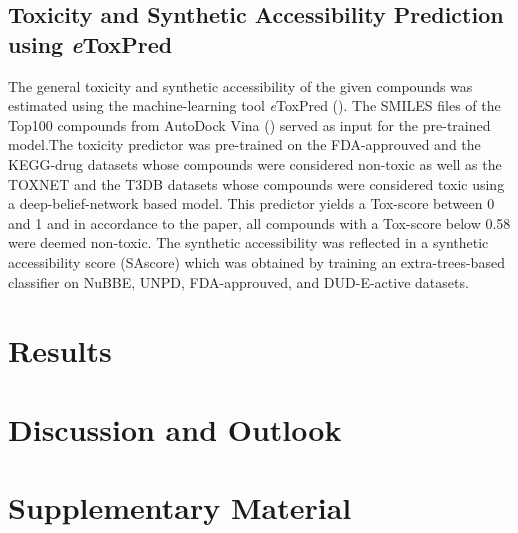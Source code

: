 \documentclass[11pt, letterpaper, titlepage]{article}
\begin{document}
\subsection{Toxicity and Synthetic Accessibility Prediction using \textit{e}ToxPred}
The general toxicity and synthetic accessibility of the given compounds was estimated using the machine-learning tool \textit{e}ToxPred (\cite{pu2019toxpred}). The SMILES files of the Top100 compounds from AutoDock Vina (\cite{Trott.2010}) served as input for the pre-trained model.The toxicity predictor was pre-trained on the FDA-approuved and the KEGG-drug datasets whose compounds were considered non-toxic as well as the TOXNET and the T3DB datasets whose compounds were considered toxic using a deep-belief-network based model. This predictor yields a Tox-score between 0 and 1 and in accordance to the paper, all compounds with a Tox-score below 0.58 were deemed non-toxic. The synthetic accessibility was reflected in a synthetic accessibility score (SAscore) which was obtained by training an extra-trees-based classifier on NuBBE, UNPD, FDA-approuved, and DUD-E-active datasets.

\section{Results} 

\FloatBarrier

\section{Discussion and Outlook}

\section{Supplementary Material}

\pagebreak
\FloatBarrier
\renewcommand{\bibname}{References}  %
\printbibliography
\end{document}
